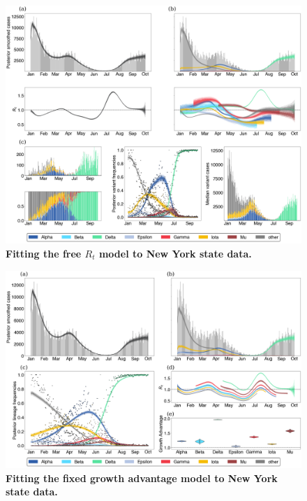 \documentclass[11pt,oneside,letterpaper]{article}
\begin{document}
\begin{figure}
  \centering
  \includegraphics[width=\linewidth]{figs/free_rt_New-York.png}
  \caption{\textbf{Fitting the free $R_{t}$ model to New York state data.}}%
  \label{fig:free_rt_New-York}
\end{figure}

\begin{figure}
  \centering
  \includegraphics[width=\linewidth]{figs/fixed_growth_New-York.png}
  \caption{\textbf{Fitting the fixed growth advantage model to New York state data.}}%
  \label{fig:fixed_growth_New-York}
\end{figure}
\end{document}

